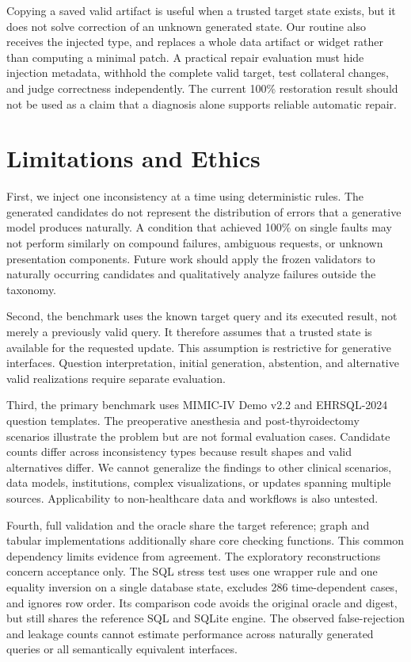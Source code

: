 \documentclass[manuscript,review,anonymous]{acmart}
\begin{document}
Copying a saved valid artifact is useful when a trusted target state exists, but it does not solve correction of an unknown generated state. Our routine also receives the injected type, and replaces a whole data artifact or widget rather than computing a minimal patch. A practical repair evaluation must hide injection metadata, withhold the complete valid target, test collateral changes, and judge correctness independently. The current 100\% restoration result should not be used as a claim that a diagnosis alone supports reliable automatic repair.

\section{Limitations and Ethics}

First, we inject one inconsistency at a time using deterministic rules. The generated candidates do not represent the distribution of errors that a generative model produces naturally. A condition that achieved 100\% on single faults may not perform similarly on compound failures, ambiguous requests, or unknown presentation components. Future work should apply the frozen validators to naturally occurring candidates and qualitatively analyze failures outside the taxonomy.

Second, the benchmark uses the known target query and its executed result, not merely a previously valid query. It therefore assumes that a trusted state is available for the requested update. This assumption is restrictive for generative interfaces. Question interpretation, initial generation, abstention, and alternative valid realizations require separate evaluation.

Third, the primary benchmark uses MIMIC-IV Demo v2.2 and EHRSQL-2024 question templates. The preoperative anesthesia and post-thyroidectomy scenarios illustrate the problem but are not formal evaluation cases. Candidate counts differ across inconsistency types because result shapes and valid alternatives differ. We cannot generalize the findings to other clinical scenarios, data models, institutions, complex visualizations, or updates spanning multiple sources. Applicability to non-healthcare data and workflows is also untested.

Fourth, full validation and the oracle share the target reference; graph and tabular implementations additionally share core checking functions. This common dependency limits evidence from agreement. The exploratory reconstructions concern acceptance only. The SQL stress test uses one wrapper rule and one equality inversion on a single database state, excludes 286 time-dependent cases, and ignores row order. Its comparison code avoids the original oracle and digest, but still shares the reference SQL and SQLite engine. The observed false-rejection and leakage counts cannot estimate performance across naturally generated queries or all semantically equivalent interfaces.
\end{document}
